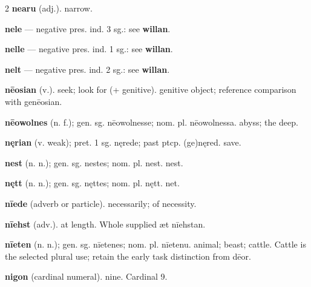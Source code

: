 \begin{multicols*}{2}
\textbf{nearu} (adj.). narrow.\par
\textbf{nele} — negative pres. ind. 3 sg.: see \textbf{willan}.\par
\textbf{nelle} — negative pres. ind. 1 sg.: see \textbf{willan}.\par
\textbf{nelt} — negative pres. ind. 2 sg.: see \textbf{willan}.\par
\textbf{nēosian} (v.). seek; look for (+ genitive). genitive object; reference comparison with genēosian.\par
\textbf{nēowolnes} (n. f.); gen. sg. nēowolnesse; nom. pl. nēowolnessa. abyss; the deep.\par
\textbf{nęrian} (v. weak); pret. 1 sg. nęrede; past ptcp. (ge)nęred. save.\par
\textbf{nest} (n. n.); gen. sg. nestes; nom. pl. nest. nest.\par
\textbf{nętt} (n. n.); gen. sg. nęttes; nom. pl. nętt. net.\par
\textbf{nīede} (adverb or particle). necessarily; of necessity.\par
\textbf{nīehst} (adv.). at length. Whole supplied æt nīehstan.\par
\textbf{nīeten} (n. n.); gen. sg. nīetenes; nom. pl. nīetenu. animal; beast; cattle. Cattle is the selected plural use; retain the early task distinction from dēor.\par
\textbf{nigon} (cardinal numeral). nine. Cardinal 9.\par

\end{multicols*}
